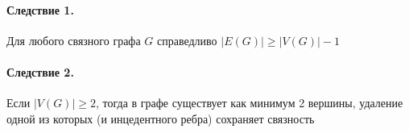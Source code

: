 \paragraph{Следствие 1.} Для любого связного графа $G$ справедливо $ \left| E(G) \right| \ge \left| V(G) \right| - 1 $

\paragraph{Следствие 2.} Если $ \left| V(G) \right| \ge 2 $, тогда в графе существует как минимум 2 вершины, удаление одной из которых (и инцедентного ребра) сохраняет связность
